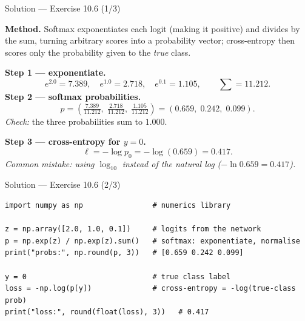 \documentclass[aspectratio=169,11pt]{beamer}
\begin{document}
\begin{frame}{Solution --- Exercise 10.6 (1/3)}
\begin{solutionbox}
  \textbf{Method.} Softmax exponentiates each logit (making it positive) and
  divides by the sum, turning arbitrary scores into a probability vector;
  cross-entropy then scores only the probability given to the \emph{true} class.

  \smallskip
  \textbf{Step 1 --- exponentiate.}
  \[
    e^{2.0} = 7.389,\quad e^{1.0} = 2.718,\quad e^{0.1} = 1.105,
    \qquad \textstyle\sum = 11.212 .
  \]
  \textbf{Step 2 --- softmax probabilities.}
  \[
    p = \left(\tfrac{7.389}{11.212},\; \tfrac{2.718}{11.212},\;
              \tfrac{1.105}{11.212}\right)
      = (0.659,\; 0.242,\; 0.099).
  \]
  \emph{Check:} the three probabilities sum to $1.000$.

  \smallskip
  \textbf{Step 3 --- cross-entropy for $y = 0$.}
  \[
    \ell = -\log p_0 = -\log(0.659) = 0.417 .
  \]
  \textit{Common mistake: using $\log_{10}$ instead of the natural log ($-\ln 0.659 = 0.417$).}
\end{solutionbox}
\end{frame}

\begin{frame}[fragile]{Solution --- Exercise 10.6 (2/3)}
\begin{solutionbox}
\begin{lstlisting}
import numpy as np                # numerics library

z = np.array([2.0, 1.0, 0.1])     # logits from the network
p = np.exp(z) / np.exp(z).sum()   # softmax: exponentiate, normalise
print("probs:", np.round(p, 3))   # [0.659 0.242 0.099]

y = 0                             # true class label
loss = -np.log(p[y])              # cross-entropy = -log(true-class prob)
print("loss:", round(float(loss), 3))   # 0.417
\end{lstlisting}
\end{solutionbox}
\end{frame}
\end{document}
